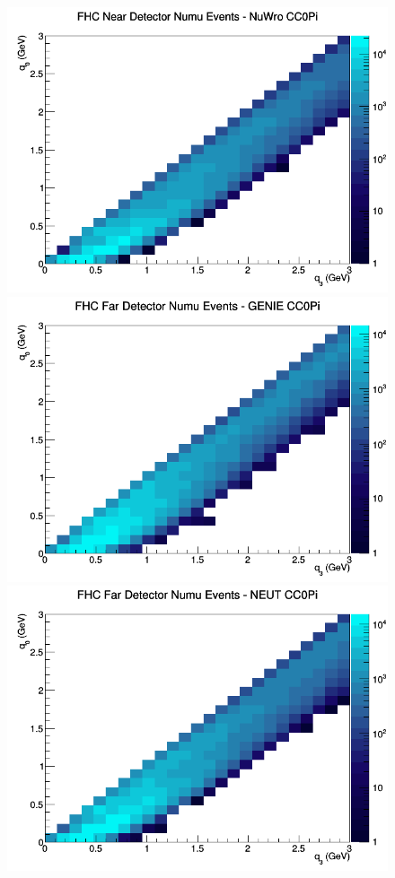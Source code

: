 \documentclass[12pt]{article}
\begin{document}
\begin{figure}[h]
\includegraphics[width=\linewidth]{q0_q3/nominal/CC0Pi_FHC_ND_numu_q3_q0_NuWro.png}
\endminipage
\newline
{}
\includegraphics[width=\linewidth]{q0_q3/nominal/CC0Pi_FHC_FD_numu_q3_q0_GENIE.png}
\endminipage
{}
\includegraphics[width=\linewidth]{q0_q3/nominal/CC0Pi_FHC_FD_numu_q3_q0_NEUT.png}

\end{figure}
\end{document}
